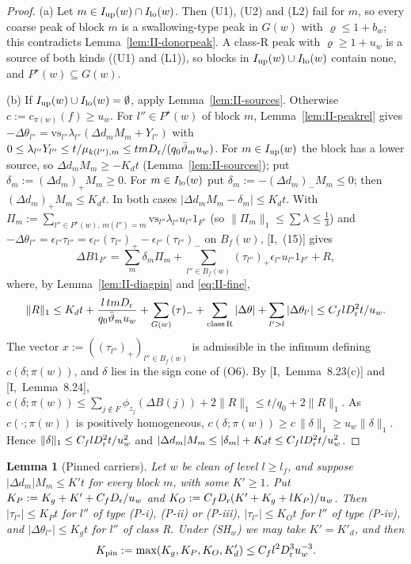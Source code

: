 \documentclass[10pt]{amsart}
\newtheorem{lemma}[theorem]{Lemma}
\theoremstyle{definition}
\theoremstyle{remark}
\begin{document}
\begin{proof}
(a) Let $m\in I_{\rm up}(w)\cap I_{\rm lo}(w)$.  Then (U1), (U2) and (L2)
fail for $m$, so every coarse peak of block $m$ is a swallowing-type peak in
$G(w)$ with $\varrho\le1+b_w$; this contradicts
Lemma~\ref{lem:II-donorpeak}.  A class-R peak with $\varrho\ge1+u_w$ is a
source of both kinds ((U1) and (L1)), so blocks in $I_{\rm up}(w)\cup
I_{\rm lo}(w)$ contain none, and $P^\star(w)\subseteq G(w)$.

(b) If $I_{\rm up}(w)\cup I_{\rm lo}(w)=\emptyset$, apply
Lemma~\ref{lem:II-sources}.  Otherwise $c:=c_{\pi(w)}(f)\ge u_w$.  For
$l''\in P^\star(w)$ of block $m$, Lemma~\ref{lem:II-peakrel} gives
$-\Delta\theta_{l''}=\mathrm{vs}_{l''}\lambda_{l''}(\Delta d_mM_m+Y_{l''})$
with $0\le\lambda_{l''}Y_{l''}\le t/\mu_{k(l''),m}\le tmD_{\rm r}/(q_0
\bar\vartheta_mu_w)$.  For $m\in I_{\rm up}(w)$ the block has a lower source, so
$\Delta d_mM_m\ge-K_dt$ (Lemma~\ref{lem:II-sources}); put $\delta_m:=
(\Delta d_m)_+M_m\ge0$.  For $m\in I_{\rm lo}(w)$ put $\delta_m:=
-(\Delta d_m)_-M_m\le0$; then $(\Delta d_m)_+M_m\le K_dt$.  In both cases
$|\Delta d_mM_m-\delta_m|\le K_dt$.  With $\Pi_m:=\sum_{l''\in P^\star(w),\,
m(l'')=m}\mathrm{vs}_{l''}\lambda_{l''}u_{l''}1_{F^c}$ (so $\|\Pi_m\|_1\le
\sum\lambda\le\frac13$) and $-\Delta\theta_{l''}=\epsilon_{l''}
\tau_{l''}=\epsilon_{l''}(\tau_{l''})_+-\epsilon_{l''}(\tau_{l''})_-$ on
$B_f(w)$, [I,~(15)] gives
\[
 \Delta B1_{F^c}=\sum_m\delta_m\Pi_m+\sum_{l''\in B_f(w)}(\tau_{l''})_+
 \epsilon_{l''}u_{l''}1_{F^c}+R,
\]
where, by Lemma~\ref{lem:II-diagpin} and \eqref{eq:II-fine},
\[
 \|R\|_1\le K_dt+\frac{l\,tmD_{\rm r}}{q_0\bar\vartheta_mu_w}+\sum_{G(w)}
 (\tau)_-+\sum_{\rm class\,R}|\Delta\theta|+\sum_{l'>l}|\Delta\theta_{l'}|
 \le C_flD_{\rm r}^2t/u_w .
\]
The vector $x:=((\tau_{l''})_+)_{l''\in B_f(w)}$ is admissible in the
infimum defining $c(\delta;\pi(w))$, and $\delta$ lies in the sign cone of
(O6).  By [I,~Lemma~8.23(c)] and [I,~Lemma~8.24],
$c(\delta;\pi(w))\le\sum_{j\notin F}\phi_{z_j}(\Delta B(j))+2\|R\|_1\le
t/q_0+2\|R\|_1$.  As $c(\cdot;\pi(w))$ is positively homogeneous,
$c(\delta;\pi(w))\ge c\,\|\delta\|_1\ge u_w\|\delta\|_1$.  Hence
$\|\delta\|_1\le C_flD_{\rm r}^2t/u_w^2$ and $|\Delta d_m|M_m\le|\delta_m|+
K_dt\le C_flD_{\rm r}^2t/u_w^2$.
\end{proof}

\begin{lemma}[Pinned carriers]\label{lem:II-pinned}
Let $w$ be clean of level $l\ge l_f$, and suppose $|\Delta d_m|M_m\le K't$
for every block $m$, with some $K'\ge1$.  Put $K_P:=K_g+K'+C_fD_{\rm r}/u_w$
and $K_O:=C_fD_{\rm r}(K'+K_g+lK_P)/u_w$.  Then $|\tau_{l''}|\le K_Pt$ for
$l''$ of type (P-i), (P-ii) or (P-iii), $|\tau_{l''}|\le K_Ot$ for $l''$ of
type (P-iv), and $|\Delta\theta_{l''}|\le K_gt$ for $l''$ of class R.  Under
\textup{(SH$_w$)} we may take $K'=K'_d$, and then
\[
 K_{\rm pin}:=\max(K_g,K_P,K_O,K'_d)\le C_fl^2D_{\rm r}^3u_w^{-3} .
\]
\end{lemma}
\end{document}
